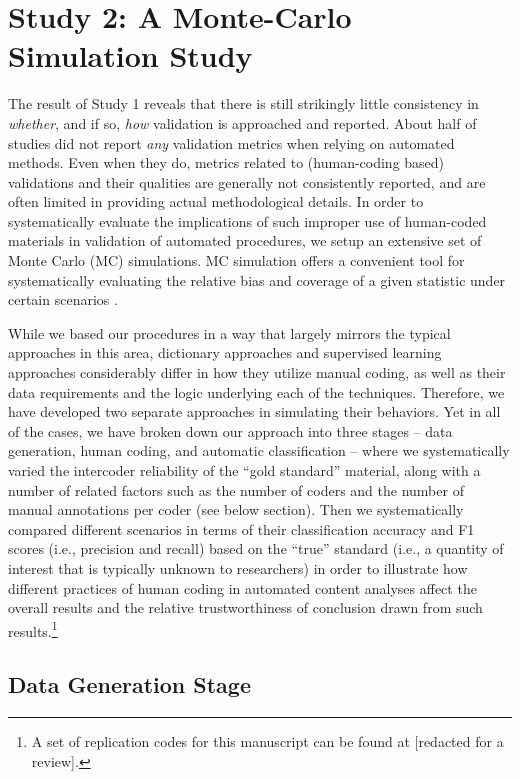 \documentclass[man, floatsintext, 12pt, a4paper, noextraspace]{apa6}
\begin{document}
\section{Study 2: A Monte-Carlo Simulation Study}
    
    The result of Study 1 reveals that there is still strikingly little consistency in \textit{whether}, and if so, \textit{how} validation is approached and reported. About half of studies did not report \textit{any} validation metrics when relying on automated methods. Even when they do, metrics related to (human-coding based) validations and their qualities are generally not consistently reported, and are often limited in providing actual methodological details. In order to systematically evaluate the implications of such improper use of human-coded materials in validation of automated procedures, we setup an extensive set of Monte Carlo (MC) simulations. MC simulation offers a convenient tool for systematically evaluating the relative bias and coverage of a given statistic under certain scenarios \parencites[][]{scharkow2017measurement, leemann2017extending}.
    
    While we based our procedures in a way that largely mirrors the typical approaches in this area, dictionary approaches and supervised learning approaches considerably differ in how they utilize manual coding, as well as their data requirements and the logic underlying each of the techniques. Therefore, we have developed two separate approaches in simulating their behaviors. Yet in all of the cases, we have broken down our approach into three stages – data generation, human coding, and automatic classification – where we systematically varied the intercoder reliability of the “gold standard” material, along with a number of related factors such as the number of coders and the number of manual annotations per coder (see below section). Then we systematically compared different scenarios in terms of their classification accuracy and F1 scores (i.e., precision and recall) based on the \enquote{true} standard (i.e., a quantity of interest that is typically unknown to researchers) in order to illustrate how different practices of human coding in automated content analyses affect the overall results and the relative trustworthiness of conclusion drawn from such results.\footnote{ A set of replication codes for this manuscript can be found at [redacted for a review].}
    
    \subsection{Data Generation Stage}
    
\end{document}
